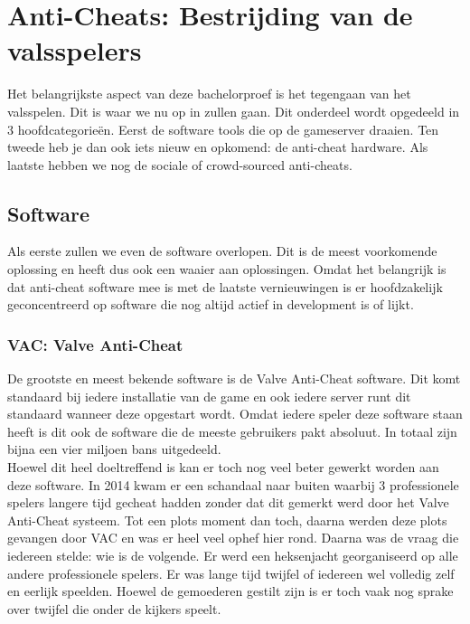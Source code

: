 \documentclass[pdftex,a4paper,12pt,twoside]{report}
\begin{document}
\chapter{Anti-Cheats: Bestrijding van de valsspelers}
\label{ch:anticheats}
Het belangrijkste aspect van deze bachelorproef is het tegengaan van het valsspelen. Dit is waar we nu op in zullen gaan. Dit onderdeel wordt opgedeeld in 3 hoofdcategorieën. Eerst de software tools die op de gameserver draaien. Ten tweede heb je dan ook iets nieuw en opkomend: de anti-cheat hardware. Als laatste hebben we nog de sociale of crowd-sourced anti-cheats.

\section{Software}
\label{sec:antisoftware}
Als eerste zullen we even de software overlopen. Dit is de meest voorkomende oplossing en heeft dus ook een waaier aan oplossingen. Omdat het belangrijk is dat anti-cheat software mee is met de laatste vernieuwingen is er hoofdzakelijk geconcentreerd op software die nog altijd actief in development is of lijkt. 

\subsection{VAC: Valve Anti-Cheat}
\label{sec:vac}
De grootste en meest bekende software is de Valve Anti-Cheat software. Dit komt standaard bij iedere installatie van de game en ook iedere server runt dit standaard wanneer deze opgestart wordt. \citep{VAC}Omdat iedere speler deze software staan heeft is dit ook de software die de meeste gebruikers pakt absoluut. In totaal zijn bijna een vier miljoen bans uitgedeeld.
\citep{steamdb}
\\

Hoewel dit heel doeltreffend is kan er toch nog veel beter gewerkt worden aan deze software. In 2014 kwam er een schandaal naar buiten waarbij 3 professionele spelers langere tijd gecheat hadden zonder dat dit gemerkt werd door het Valve Anti-Cheat systeem. Tot een plots moment dan toch, daarna werden deze plots gevangen door VAC en was er heel veel ophef hier rond. Daarna was de vraag die iedereen stelde: wie is de volgende. Er werd een heksenjacht georganiseerd op alle andere professionele spelers. Er was lange tijd twijfel of iedereen wel volledig zelf en eerlijk speelden. Hoewel de gemoederen gestilt zijn is er toch vaak nog sprake over twijfel die onder de kijkers speelt. \citep{pcgamerhackingscandal}
\\
\end{document}
